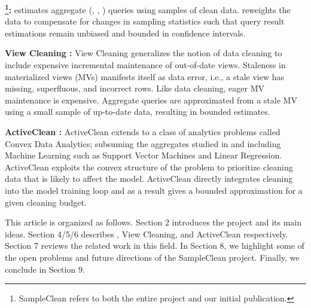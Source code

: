 \vspace{0.5em}
\noindent \textbf{\sampleclean \cite{wang1999sample} \footnote{SampleClean refers to both the entire project and our initial publication.}: } \sampleclean estimates aggregate (\sumfunc, \countfunc, \avgfunc) queries using samples of clean data. \sampleclean reweights the data to compensate for changes in sampling statistics such that query result estimations remain unbiased and bounded in confidence intervals.

\vspace{0.5em}
\noindent \textbf{View Cleaning \cite{krishnan2015svc}: } View Cleaning generalizes the notion of data cleaning to include expensive incremental maintenance of out-of-date views. Staleness in materialized views (MVs) manifests itself as data error, i.e., a stale view has missing, superfluous, and incorrect rows.
Like data cleaning, eager MV maintenance is expensive.
Aggregate queries are approximated from a stale MV using a small sample of up-to-date data, resulting in bounded estimates.

\vspace{0.5em}
\noindent \textbf{ActiveClean \cite{krishnan2015acl}: } ActiveClean extends \sampleclean to a class of analytics problems called Convex Data Analytics; subsuming the aggregates studied in \sampleclean and including Machine Learning such as Support Vector Machines and Linear Regression. ActiveClean exploits the convex structure of the problem to prioritize cleaning data that is likely to affect the model. ActiveClean directly integrates cleaning into the model training loop and as a result gives a bounded approximation for a given cleaning budget.

\vspace{0.5em}

This article is organized as follows. Section 2 introduces the project and its main ideas. Section 4/5/6 describes \sampleclean, View Cleaning, and ActiveClean respectively. Section 7 reviews the related work in this field. In Section 8, we highlight some of the open problems and future directions of the SampleClean project. Finally, we conclude in Section 9.